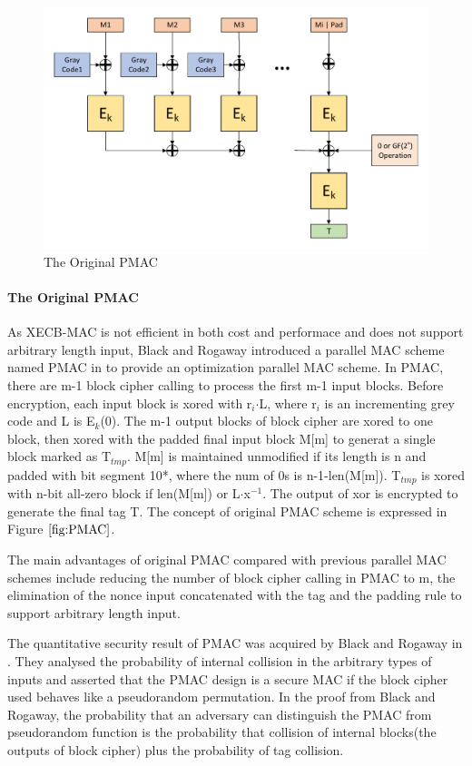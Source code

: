 \documentclass{article}
\begin{document}
\begin{figure}[htbp]
\centering
\includegraphics[scale=0.5]{./diagrams/PMAC.pdf}
\caption{The Original PMAC}
\label{fig:PMAC}
\end{figure}
\paragraph{The Original PMAC}
As XECB-MAC is not efficient in both cost and performace and does not support arbitrary length input, Black and Rogaway introduced a parallel MAC scheme named PMAC in \cite{pmac} to provide an optimization parallel MAC scheme.  
In PMAC, there are m-1 block cipher calling to process the first m-1 input blocks. Before encryption, each input block is xored with r$_i$$\cdot$L, where r$_i$ is an incrementing grey code and L is E$_k$(0). The m-1 output blocks of block cipher are xored to one block, then xored with the padded final input block M[m] to generat a single block marked as T$_{tmp}$. M[m] is maintained unmodified if its length is n and padded with bit segment 10*, where the num of 0s is n-1-len(M[m]).  
T$_{tmp}$ is xored with n-bit all-zero block if len(M[m]) or L$\cdot$x$^{-1}$.  The output of xor is encrypted to generate the final tag T. The concept of original PMAC scheme is expressed in Figure $\ref{fig:PMAC}$. 

The main advantages of original PMAC compared with previous parallel MAC schemes include reducing the number of block cipher calling in PMAC to m, the elimination of the nonce input concatenated with the tag and the padding rule to support arbitrary length input.   

The quantitative security result of PMAC was acquired by Black and Rogaway in \cite{pmac}. They analysed the probability of internal collision in the arbitrary types of inputs and asserted that the PMAC design is a secure MAC if the block cipher used behaves like a pseudorandom permutation. In the proof from Black and Rogaway, the probability that an adversary can distinguish the PMAC from pseudorandom function is the probability that collision of internal blocks(the outputs of block cipher) plus the probability of tag collision. 
\end{document}
